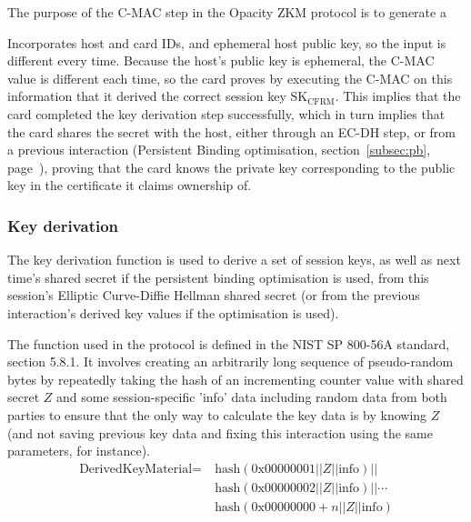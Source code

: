 \documentclass[12pt]{article}
\begin{document}
The purpose of the C-MAC step in the Opacity ZKM protocol is to generate a 

Incorporates host and card IDs, and ephemeral host public key, so the input is different every time. Because the host's public key is ephemeral, the C-MAC value is different each time, so the card proves by executing the C-MAC on this information that it derived the correct session key $\text{SK}_{\text{CFRM}}$. This implies that the card completed the key derivation step successfully, which in turn implies that the card shares the secret with the host, either through an EC-DH step, or from a previous interaction (Persistent Binding optimisation, section~\ref{subsec:pb}, page~\pageref{subsec:pb}), proving that the card knows the private key corresponding to the public key in the certificate it claims ownership of. 




\subsubsection{Key derivation}
\label{subsec:kdf}

The key derivation function is used to derive a set of session keys, as well as next time's shared secret if the persistent binding optimisation is used, from this session's Elliptic Curve-Diffie Hellman shared secret (or from the previous interaction's derived key values if the optimisation is used).

The function used in the protocol is defined in the NIST SP 800-56A standard, section 5.8.1. It involves creating an arbitrarily long sequence of pseudo-random bytes by repeatedly taking the hash of an incrementing counter value with shared secret $Z$ and some session-specific 'info' data including random data from both parties to ensure that the only way to calculate the key data is by knowing $Z$ (and not saving previous key data and fixing this interaction using the same parameters, for instance). 
\begin{align*}
\text{DerivedKeyMaterial} =\ &\text{hash}(0\text{x}00000001||Z||\text{info})||\\
&\text{hash}(0\text{x}00000002||Z||\text{info})|| \cdots\\
&\text{hash}(0\text{x}00000000+n||Z||\text{info})\\
\end{align*}
\end{document}
